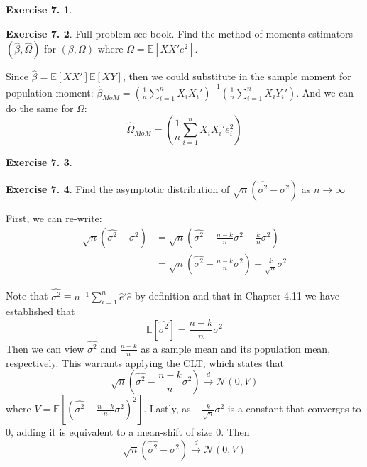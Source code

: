 \documentclass[12pt,letterpaper,reqno]{amsart}
\newcommand{\E}{\mathbb E}
\theoremstyle{plain}
\theoremstyle{definition}
\theoremstyle{definition}
\newtheorem{Exercise}{Exercise 7.}
\numberwithin{equation}{section}
\begin{document}
\begin{Exercise}\end{Exercise}

\begin{Exercise} Full problem see book. Find the method of moments estimators $(\hat{\beta},\hat{\Omega})$ for $(\beta,\Omega)$ where $\Omega = \E[XX'e^2]$.

    Since $\hat{\beta} = \E[XX']\E[XY]$, then we could substitute in the sample moment for population moment: $\hat{\beta}_{MoM} = (\frac{1}{n} \sum_{i=1}^n X_i X_i')^{-1} (\frac{1}{n} \sum_{i=1}^n X_i Y_i') $. And we can do the same for $\Omega$:
    \[
        \hat{\Omega}_{MoM} = (\frac{1}{n} \sum_{i=1}^n X_i X_i' e_i^2)
    \]
    

\end{Exercise}

\begin{Exercise}\end{Exercise}

\begin{Exercise} Find the asymptotic distribution of $\sqrt{n}(\widehat{\sigma^2} - \sigma^2)$ as $n \rightarrow \infty$

    First, we can re-write:
   \[\begin{split}
     \sqrt{n}(\widehat{\sigma^2} - \sigma^2) & = \sqrt{n}(\widehat{\sigma^2} - \frac{n-k}{n} \sigma^2 - \frac{k}{n} \sigma^2) \\ 
    & = \sqrt{n}(\widehat{\sigma^2} - \frac{n-k}{n} \sigma^2) - \frac{k}{\sqrt{n}} \sigma^2
    \end{split}\]

    Note that $\widehat{\sigma^2} \equiv n^{-1} \sum_{i=1}^n \hat{e}'\hat{e} $ by definition and that in Chapter 4.11 we have established that 
    \[
    \E[\widehat{\sigma^2}] = \frac{n-k}{n} \sigma^2
    \]
    Then we can view $\widehat{\sigma^2}$ and $\frac{n-k}{n}$ as a sample mean and its population mean, respectively. This warrants applying the CLT, which states that 
    \[
    \sqrt{n}(\widehat{\sigma^2} - \frac{n-k}{n} \sigma^2) \xrightarrow[]{d} \mathcal{N}(0,V)
    \]
    where $V=\E[(\widehat{\sigma^2} - \frac{n-k}{n} \sigma^2)^2]$. Lastly, as $- \frac{k}{\sqrt{n}} \sigma^2$ is a constant that converges to $0$, adding it is equivalent to a mean-shift of size $0$. Then
    \[
    \sqrt{n}(\widehat{\sigma^2} - \sigma^2) \xrightarrow[]{d} \mathcal{N}(0,V)
    \]

\end{Exercise}
\end{document}
